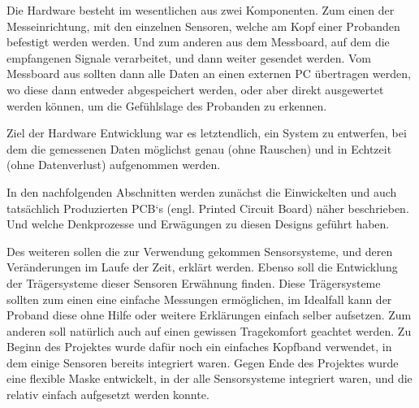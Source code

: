 
Die Hardware besteht im wesentlichen aus zwei Komponenten. Zum einen der Messeinrichtung, mit den einzelnen Sensoren, welche am Kopf einer Probanden befestigt werden werden. Und zum anderen aus dem Messboard, auf dem die empfangenen Signale verarbeitet, und dann weiter gesendet werden. Vom Messboard aus sollten dann alle Daten an einen externen PC übertragen werden, wo diese dann entweder abgespeichert werden, oder aber direkt ausgewertet werden können, um die Gefühlslage des Probanden zu erkennen.

Ziel der Hardware Entwicklung war es letztendlich, ein System zu entwerfen, bei dem die gemessenen Daten möglichst genau (ohne Rauschen) und in Echtzeit (ohne Datenverlust) aufgenommen werden.

In den nachfolgenden Abschnitten werden zunächst die Einwickelten und auch tatsächlich Produzierten PCB‘s (engl. Printed Circuit Board) näher beschrieben. Und welche Denkprozesse und Erwägungen zu diesen Designs geführt haben.

Des weiteren sollen die zur Verwendung gekommen Sensorsysteme, und deren Veränderungen im Laufe der Zeit, erklärt werden. Ebenso soll die Entwicklung der Trägersysteme dieser Sensoren Erwähnung finden. Diese Trägersysteme sollten zum einen eine einfache Messungen ermöglichen, im Idealfall kann der Proband diese ohne Hilfe oder weitere Erklärungen einfach selber aufsetzen. Zum anderen soll natürlich auch auf einen gewissen Tragekomfort geachtet werden. Zu Beginn des Projektes wurde dafür noch ein einfaches Kopfband verwendet, in dem einige Sensoren bereits integriert waren. Gegen Ende des Projektes wurde eine flexible Maske entwickelt, in der alle Sensorsysteme integriert waren, und die relativ einfach aufgesetzt werden konnte.

%

%









